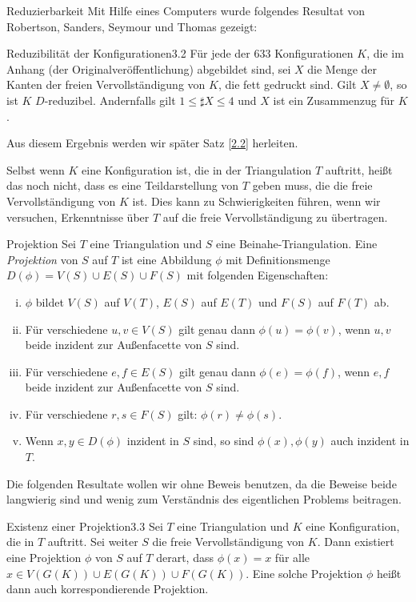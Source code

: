 \begin{section}{Reduzierbarkeit}
 Mit Hilfe eines Computers wurde folgendes Resultat von Robertson, Sanders, Seymour und Thomas gezeigt:
 
 \begin{satzl}{Reduzibilität der Konfigurationen}{3.2}
  Für jede der 633 Konfigurationen $K$, die im Anhang (der Originalveröffentlichung) abgebildet sind, sei $X$ die Menge der Kanten der freien Vervollständigung von $K$, die fett gedruckt sind. Gilt $X \neq \emptyset$, so ist $K$ $D$-reduzibel. Andernfalls gilt $1\leq \sharp X \leq 4$ und $X$ ist ein Zusammenzug für $K$.
 \end{satzl}
 
 Aus diesem Ergebnis werden wir später Satz \ref{2.2} herleiten.

 Selbst wenn $K$ eine Konfiguration ist, die in der Triangulation $T$ auftritt, heißt das noch nicht, dass es eine Teildarstellung von $T$ geben muss, die die freie Vervollständigung von $K$ ist. Dies kann zu Schwierigkeiten führen, wenn wir versuchen, Erkenntnisse über $T$ auf die freie Vervollständigung zu übertragen. 
 
 \begin{definition}{Projektion}
  Sei $T$ eine Triangulation und $S$ eine Beinahe-Triangulation. Eine \textit{Projektion} von $S$ auf $T$ ist eine Abbildung $\phi$ mit Definitionsmenge $D(\phi) = V(S)\cup E(S)\cup F(S)$ mit folgenden Eigenschaften:
  \begin{enumerate}[(i)]
   \item $\phi$ bildet $V(S)$ auf $V(T)$, $E(S)$ auf $E(T)$ und $F(S)$ auf $F(T)$ ab.
   \item Für verschiedene $u,v \in V(S)$ gilt genau dann $\phi(u) = \phi(v)$, wenn $u,v$ beide inzident zur Außenfacette von $S$ sind.
   \item Für verschiedene $e,f \in E(S)$ gilt genau dann $\phi(e) = \phi(f)$, wenn $e,f$ beide inzident zur Außenfacette von $S$ sind.
   \item Für verschiedene $r,s \in F(S)$ gilt: $\phi(r) \neq \phi(s)$.
   \item Wenn $x,y \in D(\phi)$ inzident in $S$ sind, so sind $\phi(x),\phi(y)$ auch inzident in $T$.
  \end{enumerate}
 \end{definition}
 
 Die folgenden Resultate wollen wir ohne Beweis benutzen, da die Beweise beide langwierig sind und wenig zum Verständnis des eigentlichen Problems beitragen.

 \begin{satzl}{Existenz einer Projektion}{3.3}
  Sei $T$ eine Triangulation und $K$ eine Konfiguration, die in $T$ auftritt. Sei weiter $S$ die freie Vervollständigung von $K$. Dann existiert eine Projektion $\phi$ von $S$ auf $T$ derart, dass $\phi(x) = x$ für alle $x\in V(G(K)) \cup E(G(K)) \cup F(G(K))$. Eine solche Projektion $\phi$ heißt dann auch korrespondierende Projektion.
 \end{satzl}
 

\end{section}
